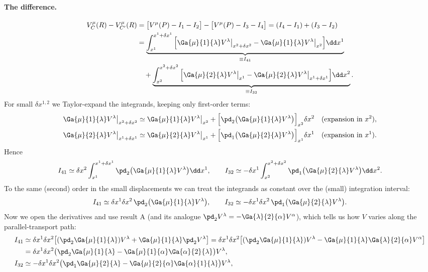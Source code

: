 \paragraph{The difference.}
\begin{align}
  V_C^\mu(R)-V_{C'}^\mu(R)&=\big[V^\mu(P)-I_1-I_2\big]-\big[V^\mu(P)-I_3-I_4\big]=(I_4-I_1)+(I_3-I_2)\nonumber\\
  &=\underbrace{\int_{x^1}^{x^1+\delta x^1}\Big[\Ga{\mu}{1}{\lambda}V^\lambda\big|_{x^2+\delta x^2}-\Ga{\mu}{1}{\lambda}V^\lambda\big|_{x^2}\Big]\dd x^1}_{\equiv I_{41}}\nonumber\\
  &\quad+\underbrace{\int_{x^2}^{x^2+\delta x^2}\Big[\Ga{\mu}{2}{\lambda}V^\lambda\big|_{x^1}-\Ga{\mu}{2}{\lambda}V^\lambda\big|_{x^1+\delta x^1}\Big]\dd x^2}_{\equiv I_{32}} .
\end{align}
For small $\delta x^{1,2}$ we Taylor-expand the integrands, keeping only first-order terms:
\begin{align*}
  \Ga{\mu}{1}{\lambda}V^\lambda\big|_{x^2+\delta x^2}&\simeq\Ga{\mu}{1}{\lambda}V^\lambda\big|_{x^2}+\Big[\pd_2\big(\Ga{\mu}{1}{\lambda}V^\lambda\big)\Big]_{x^2}\delta x^2 \quad\text{(expansion in $x^2$)},\\
  \Ga{\mu}{2}{\lambda}V^\lambda\big|_{x^1+\delta x^1}&\simeq\Ga{\mu}{2}{\lambda}V^\lambda\big|_{x^1}+\Big[\pd_1\big(\Ga{\mu}{2}{\lambda}V^\lambda\big)\Big]_{x^1}\delta x^1 \quad\text{(expansion in $x^1$)}.
\end{align*}
Hence
\[
  I_{41}\simeq\delta x^2\int_{x^1}^{x^1+\delta x^1}\pd_2\big(\Ga{\mu}{1}{\lambda}V^\lambda\big)\dd x^1,\qquad
  I_{32}\simeq-\delta x^1\int_{x^2}^{x^2+\delta x^2}\pd_1\big(\Ga{\mu}{2}{\lambda}V^\lambda\big)\dd x^2 .
\]
To the same (second) order in the small displacements we can treat the integrands as constant over the (small) integration interval:
\[
  I_{41}\simeq\delta x^1\delta x^2\,\pd_2\big(\Ga{\mu}{1}{\lambda}V^\lambda\big),\qquad I_{32}\simeq-\delta x^1\delta x^2\,\pd_1\big(\Ga{\mu}{2}{\lambda}V^\lambda\big).
\]
Now we open the derivatives and use result A (and its analogue $\pd_2V^\lambda=-\Ga{\lambda}{2}{\alpha}V^\alpha$), which tells us how $V$ varies along the parallel-transport path:
\begin{align*}
  I_{41}&\simeq\delta x^1\delta x^2\big[(\pd_2\Ga{\mu}{1}{\lambda})V^\lambda+\Ga{\mu}{1}{\lambda}\pd_2V^\lambda\big]
  =\delta x^1\delta x^2\big[(\pd_2\Ga{\mu}{1}{\lambda})V^\lambda-\Ga{\mu}{1}{\lambda}\Ga{\lambda}{2}{\alpha}V^\alpha\big]\\
  &=\delta x^1\delta x^2\big(\pd_2\Ga{\mu}{1}{\lambda}-\Ga{\mu}{1}{\alpha}\Ga{\alpha}{2}{\lambda}\big)V^\lambda,\\
  I_{32}&\simeq-\delta x^1\delta x^2\big(\pd_1\Ga{\mu}{2}{\lambda}-\Ga{\mu}{2}{\alpha}\Ga{\alpha}{1}{\lambda}\big)V^\lambda ,
\end{align*}
